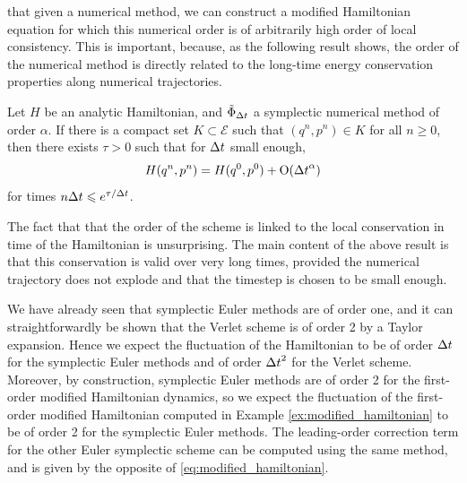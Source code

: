     that given a numerical method, we can construct a modified Hamiltonian equation for which this numerical order is of arbitrarily high order of local consistency.
    This is important, because, as the following result \cite[Theorem IX.8.1]{H13} shows, the order of the numerical method is directly related to the long-time energy conservation properties along numerical trajectories.
    \begin{theorem}
        Let $H$ be an analytic Hamiltonian, and $\tilde\Phi_{\Delta t}$ a symplectic numerical method of order $\alpha$.
        If there is a compact set $K\subset \mathcal E$ such that $(q^n,p^n)\in K$ for all $n\geq 0$, then there exists $\tau>0$ such that for ${\Delta t}$ small enough,
        \begin{equation} \label{eq:long_time_energy_conservation}H(q^n,p^n)=H(q^0,p^0)+\mathrm{O}({\Delta t}^\alpha)\end{equation}
        for times $n{\Delta t}\leqslant e^{\tau/{\Delta t}}$.
    \end{theorem}
    The fact that that the order of the scheme is linked to the local conservation in time of the Hamiltonian is unsurprising.
    The main content of the above result is that this conservation is valid over very long times, provided the numerical trajectory does not explode and that the timestep is chosen to be small enough.
    
    We have already seen that symplectic Euler methods are of order one, and it can straightforwardly be shown that the Verlet scheme is of order 2 by a Taylor expansion.
    Hence we expect the fluctuation of the Hamiltonian to be of order ${\Delta t}$ for the symplectic Euler methods and of order ${\Delta t}^2$ for the Verlet scheme.
    Moreover, by construction, symplectic Euler methods are of order 2 for the first-order modified Hamiltonian dynamics, 
    so we expect the fluctuation of the first-order modified Hamiltonian computed in Example \ref{ex:modified_hamiltonian} to be of order 2 for the symplectic Euler methods. 
    The leading-order correction term for the other Euler symplectic scheme can be computed using the same method, and is given by the opposite of \eqref{eq:modified_hamiltonian}.

